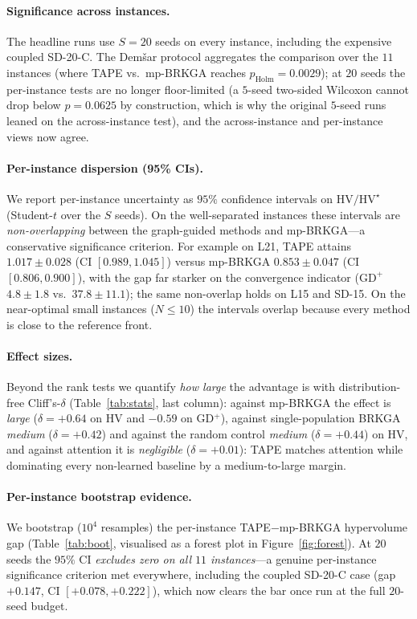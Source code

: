 \documentclass[11pt]{article}
\begin{document}
\paragraph{Significance across instances.} The headline runs use $S{=}20$ seeds on every
instance, including the expensive coupled \textsf{SD-20-C}. The Dem\v{s}ar protocol aggregates
the comparison over the $11$ instances (where TAPE vs.\ mp-BRKGA reaches $p_{\text{Holm}}=0.0029$);
at $20$ seeds the per-instance tests are no longer floor-limited (a $5$-seed two-sided Wilcoxon
cannot drop below $p=0.0625$ by construction, which is why the original $5$-seed runs leaned on
the across-instance test), and the across-instance and per-instance views now agree.

\paragraph{Per-instance dispersion (95\% CIs).} We report per-instance uncertainty as
$95\%$ confidence intervals on $\mathrm{HV}/\mathrm{HV}^\star$ (Student-$t$ over the $S$
seeds). On the well-separated instances these intervals are \emph{non-overlapping} between
the graph-guided methods and mp-BRKGA---a conservative significance criterion. For example
on \textsf{L21}, TAPE attains $1.017\pm0.028$ (CI $[0.989,1.045]$) versus mp-BRKGA
$0.853\pm0.047$ (CI $[0.806,0.900]$), with the gap far starker on the convergence indicator
($\mathrm{GD}^+$ $4.8\pm1.8$ vs.\ $37.8\pm11.1$); the same non-overlap holds on
\textsf{L15} and \textsf{SD-15}. On the near-optimal small instances ($N\le10$) the
intervals overlap because every method is close to the reference front.

\paragraph{Effect sizes.} Beyond the rank tests we quantify \emph{how large} the advantage
is with distribution-free Cliff's-$\delta$ (Table~\ref{tab:stats}, last column): against
mp-BRKGA the effect is \emph{large} ($\delta=+0.64$ on HV and $-0.59$ on GD$^+$), against
single-population BRKGA \emph{medium} ($\delta=+0.42$) and against the random control
\emph{medium} ($\delta=+0.44$) on HV, and against attention it is \emph{negligible}
($\delta=+0.01$): TAPE matches attention while dominating every non-learned baseline by a
medium-to-large margin.

\paragraph{Per-instance bootstrap evidence.} We bootstrap ($10^{4}$ resamples) the
per-instance TAPE$-$mp-BRKGA hypervolume gap (Table~\ref{tab:boot}, visualised as a forest
plot in Figure~\ref{fig:forest}). At $20$ seeds the $95\%$ CI \emph{excludes zero on all $11$
instances}---a genuine per-instance significance criterion met everywhere, including the
coupled \textsf{SD-20-C} case (gap $+0.147$, CI $[+0.078,+0.222]$), which now clears the bar
once run at the full $20$-seed budget.
\end{document}
